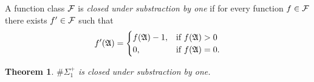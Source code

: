 \documentclass[12pt]{article}
\def\A{{\frak A}}
\def\F{{\cal F}}
\newtheorem{theo}{Theorem}
\begin{document}

A function class $\F$ is {\em closed under substraction by one} if for every function $f \in \F$ there exists $f' \in \F$ such that 
\begin{eqnarray*}
f'(\A) =
\begin{cases}
f(\A)-1, & \text{if }f(\A) > 0 \\
0, & \text{if }f(\A) = 0.
\end{cases}
\end{eqnarray*}
\begin{theo}
$\#\Sigma_1^+$ is closed under substraction by one.
\end{theo}
\end{document}
